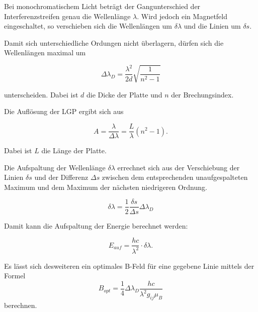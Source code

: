 Bei monochromatischem Licht beträgt der Gangunterschied der Interferenzstreifen genau die Wellenlänge $\lambda$. Wird
jedoch ein Magnetfeld eingeschaltet, so verschieben sich die Wellenlängen um $\delta \lambda$ und die Linien um
$\delta s$.

Damit sich unterschiedliche Ordungen nicht überlagern, dürfen sich die Wellenlängen maximal um

\begin{equation}
  \Delta\lambda_{D} = \frac{\lambda^2}{2d} \sqrt{\frac{1}{n^2-1}}
  \label{eqn:delta_lambda}
\end{equation}

unterscheiden. Dabei ist $d$ die Dicke der Platte und $n$ der Brechungsindex.

Die Auflösung der LGP ergibt sich aus

\begin{equation}
  A = \frac{\lambda}{\Delta\lambda} = \frac{L}{\lambda} \left(n^2-1\right) .
\end{equation}

Dabei ist $L$ die Länge der Platte.

Die Aufspaltung der Wellenlänge $\delta \lambda$ errechnet sich aus der Verschiebung der Linien $\delta s$ und der
Differenz $\Delta s$ zwischen dem entsprechenden unaufgespalteten Maximum und dem Maximum der nächsten niedrigeren Ordnung.

\begin{equation}
	\delta \lambda = \frac{1}{2} \frac{\delta s}{\Delta s} \Delta\lambda_{D}
	\label{eqn:del_lambda}
\end{equation}

Damit kann die Aufspaltung der Energie berechnet werden:

\begin{equation}
	E_{auf} = \frac{h c}{\lambda^2} \cdot \delta \lambda .
	\label{eqn:E_auf}
\end{equation}

Es lässt sich desweiteren ein optimales B-Feld für eine gegebene Linie mittels der Formel
\begin{equation}
	B_{opt} = \frac{1}{4}\Delta \lambda_D\frac{hc}{\lambda^2 g_{ij} \mu_B}
\end{equation}
berechnen.